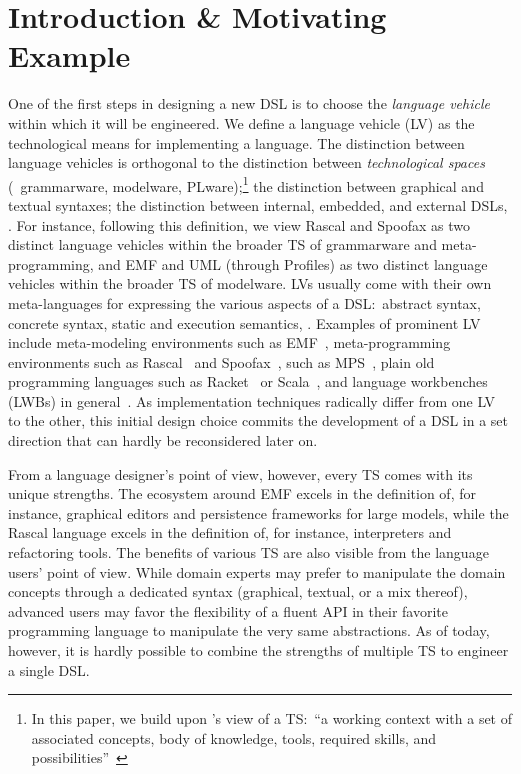 \documentclass[sigplan]{acmart}
\begin{document}
\section{Introduction \& Motivating Example}
One of the first steps in designing a new DSL is to choose the \emph{language vehicle} within which it will be engineered.
We define a language vehicle (LV) as the technological means for implementing a language.
The distinction between language vehicles is orthogonal to the distinction between \emph{technological spaces} (\eg~grammarware, modelware, PLware);\footnote{In this paper, we build upon \citeauthor{kurtev2002technological}'s view of a TS:~``a working context with a set of associated concepts, body of knowledge, tools, required skills, and possibilities''~\cite{kurtev2002technological}} the distinction between graphical and textual syntaxes; the distinction between internal, embedded, and external DSLs, \etc.
For instance, following this definition, we view Rascal and Spoofax as two distinct language vehicles within the broader TS of grammarware and meta-programming, and EMF and UML (through Profiles) as two distinct language vehicles within the broader TS of modelware.
LVs usually come with their own meta-languages for expressing the various aspects of a DSL:~abstract syntax, concrete syntax, static and execution semantics, \etc.
Examples of prominent LV include meta-modeling environments such as EMF~\cite{steinberg2008emf}, meta-programming environments such as Rascal~\cite{klint2010easy} and Spoofax~\cite{kats2010spoofax},  such as MPS~\cite{voelter2013language}, plain old programming languages such as Racket~\cite{felleisen2018programmable} or Scala~\cite{hofer2010modular}, and language workbenches (LWBs) in general~\cite{erdweg2015evaluating}.
As implementation techniques radically differ from one LV to the other, this initial design choice commits the development of a DSL in a set direction that can hardly be reconsidered later on.

From a language designer's point of view, however, every TS comes with its unique strengths.
The ecosystem around EMF excels in the definition of, for instance, graphical editors and persistence frameworks for large models, while the Rascal language excels in the definition of, for instance, interpreters and refactoring tools.
The benefits of various TS are also visible from the language users' point of view.
While domain experts may prefer to manipulate the domain concepts through a dedicated syntax (graphical, textual, or a mix thereof), advanced users may favor the flexibility of a fluent API in their favorite programming language to manipulate the very same abstractions.
As of today, however, it is hardly possible to combine the strengths of multiple TS to engineer a single DSL.
\end{document}
